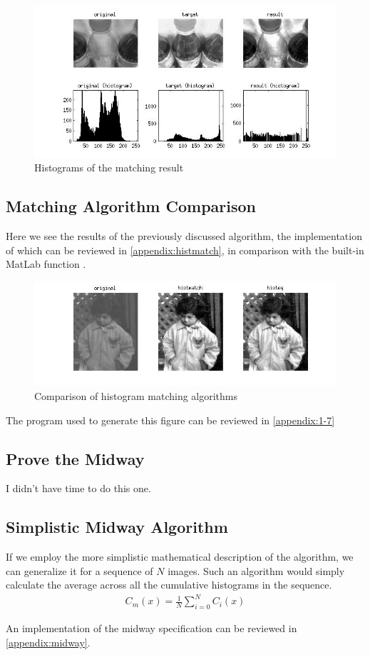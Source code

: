 \begin{figure}[H]
    \includegraphics[scale=0.65]{figures/1-6.jpg}
    \caption{Histograms of the matching result}
    \label{fig:1-6}
\end{figure}

\subsection{Matching Algorithm Comparison}
Here we see the results of the previously discussed algorithm, the
implementation of which can be reviewed in \ref{appendix:histmatch}, in
comparison with the built-in MatLab function .

\begin{figure}[H]
    \includegraphics[scale=0.65]{figures/1-7.jpg}
    \caption{Comparison of histogram matching algorithms}
    \label{fig:1-7}
\end{figure}

The program used to generate this figure can be reviewed in \ref{appendix:1-7}

\subsection{Prove the Midway}
I didn't have time to do this one.

\subsection{Simplistic Midway Algorithm}
If we employ the more simplistic mathematical description of the algorithm,
we can generalize it for a sequence of $N$ images. Such an algorithm would
simply calculate the average across all the cumulative histograms in the
sequence.
\begin{align}
    C_m(x) = \frac{1}{N} \sum_{i=0}^{N}C_i(x)
\end{align}

An implementation of the midway specification can be reviewed in
\ref{appendix:midway}.
